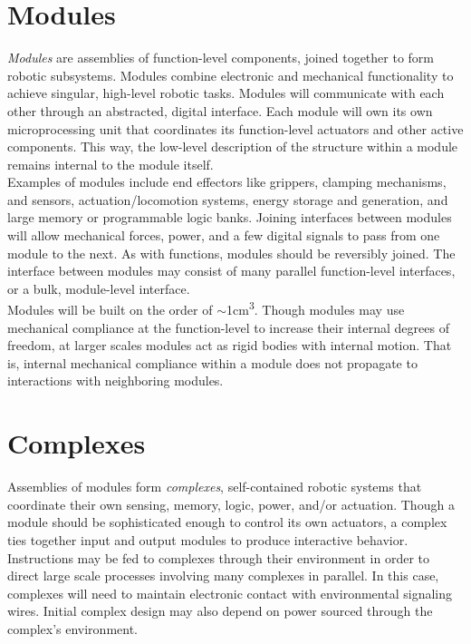 {\section{Modules}

\textit{Modules} are assemblies of function-level components, joined together to form robotic subsystems.  Modules combine electronic and mechanical functionality to achieve singular, high-level robotic tasks.  Modules will communicate with each other through an abstracted, digital interface.  Each module will own its own microprocessing unit that coordinates its function-level actuators and other active components.  This way, the low-level description of the structure within a module remains internal to the module itself.\\

Examples of modules include end effectors like grippers, clamping mechanisms, and sensors, actuation/locomotion systems, energy storage and generation, and large memory or programmable logic banks.  Joining interfaces between modules will allow mechanical forces, power, and a few digital signals to pass from one module to the next.  As with functions, modules should be reversibly joined.  The interface between modules may consist of many parallel function-level interfaces, or a bulk, module-level interface.\\

Modules will be built on the order of $\sim$1cm\textsuperscript{3}.  Though modules may use mechanical compliance at the function-level to increase their internal degrees of freedom, at larger scales modules act as rigid bodies with internal motion.  That is, internal mechanical compliance within a module does not propagate to interactions with neighboring modules.%

\section{Complexes}

Assemblies of modules form \textit{complexes}, self-contained robotic systems that coordinate their own sensing, memory, logic, power, and/or actuation.  Though a module should be sophisticated enough to control its own actuators, a complex ties together input and output modules to produce interactive behavior.  Instructions may be fed to complexes through their environment in order to direct large scale processes involving many complexes in parallel.  In this case, complexes will need to maintain electronic contact with environmental signaling wires.  Initial complex design may also depend on power sourced through the complex's environment.\\

}
